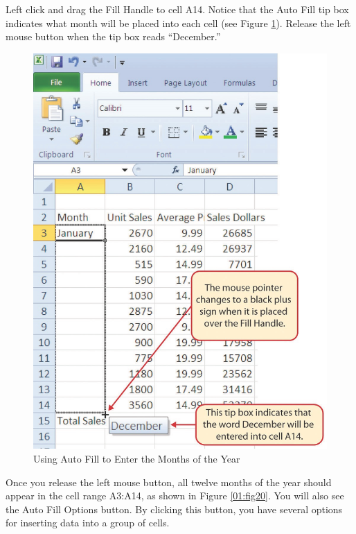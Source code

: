Left click and drag the Fill Handle to cell \textsf{A14}. Notice that the Auto Fill tip box indicates what month will be placed into each cell (see Figure \ref{01:fig19}). Release the left mouse button when the tip box reads ``December.''

\begin{figure}[H]
	\centering
	\includegraphics[width=\maxwidth{.95\linewidth}]{gfx/ch01_fig19}
	\caption{Using Auto Fill to Enter the Months of the Year}
	\label{01:fig19}
\end{figure}

Once you release the left mouse button, all twelve months of the year should appear in the cell range \textsf{A3:A14}, as shown in Figure \ref{01:fig20}. You will also see the Auto Fill Options button. By clicking this button, you have several options for inserting data into a group of cells.

